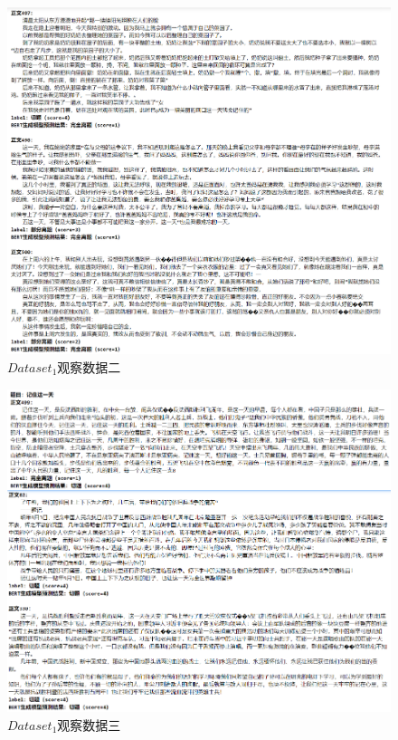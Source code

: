 \documentclass[11pt]{article}
\begin{document}
\begin{CJK}{UTF8}{gkai}
\begin{figure}[htbp]\small
  \centering
  \includegraphics[width=1.0\linewidth]{zw2.png}
  \caption{$Dataset_1$观察数据二}
  \label{framework}
\end{figure}

\begin{figure}[htbp]\small
  \centering
  \includegraphics[width=1.0\linewidth]{zw3.png}
  \caption{$Dataset_1$观察数据三}
  \label{framework}
\end{figure}


\end{CJK}
\end{document}
